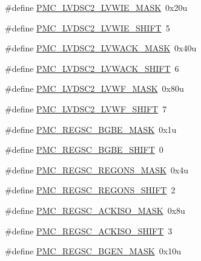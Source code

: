 \begin{DoxyCompactItemize}
\item 
\#define \hyperlink{group___p_m_c___register___masks_ga3a9de69524d99d6ec8985d211bc7861d}{P\+M\+C\+\_\+\+L\+V\+D\+S\+C2\+\_\+\+L\+V\+W\+I\+E\+\_\+\+M\+A\+SK}~0x20u
\item 
\#define \hyperlink{group___p_m_c___register___masks_gaf5cb9cf53bade8254aa7749b5eb36eff}{P\+M\+C\+\_\+\+L\+V\+D\+S\+C2\+\_\+\+L\+V\+W\+I\+E\+\_\+\+S\+H\+I\+FT}~5
\item 
\#define \hyperlink{group___p_m_c___register___masks_ga8b0c8bcad4d38e6ff797e9bc3d9db6d7}{P\+M\+C\+\_\+\+L\+V\+D\+S\+C2\+\_\+\+L\+V\+W\+A\+C\+K\+\_\+\+M\+A\+SK}~0x40u
\item 
\#define \hyperlink{group___p_m_c___register___masks_ga99ad1d373a7be7591a7ee3577bed5374}{P\+M\+C\+\_\+\+L\+V\+D\+S\+C2\+\_\+\+L\+V\+W\+A\+C\+K\+\_\+\+S\+H\+I\+FT}~6
\item 
\#define \hyperlink{group___p_m_c___register___masks_ga34187b0598a3e166a457818770a616d4}{P\+M\+C\+\_\+\+L\+V\+D\+S\+C2\+\_\+\+L\+V\+W\+F\+\_\+\+M\+A\+SK}~0x80u
\item 
\#define \hyperlink{group___p_m_c___register___masks_ga8bcfb9fc5fd4a92164b2aa6cdb6db77e}{P\+M\+C\+\_\+\+L\+V\+D\+S\+C2\+\_\+\+L\+V\+W\+F\+\_\+\+S\+H\+I\+FT}~7
\item 
\#define \hyperlink{group___p_m_c___register___masks_ga98cf5c98c133e20fb620faa6ca29d98e}{P\+M\+C\+\_\+\+R\+E\+G\+S\+C\+\_\+\+B\+G\+B\+E\+\_\+\+M\+A\+SK}~0x1u
\item 
\#define \hyperlink{group___p_m_c___register___masks_ga2e23aa8155158c86fc53ccd8baccf24d}{P\+M\+C\+\_\+\+R\+E\+G\+S\+C\+\_\+\+B\+G\+B\+E\+\_\+\+S\+H\+I\+FT}~0
\item 
\#define \hyperlink{group___p_m_c___register___masks_gab830f2c82eef6d0db7caab8ee5689ba6}{P\+M\+C\+\_\+\+R\+E\+G\+S\+C\+\_\+\+R\+E\+G\+O\+N\+S\+\_\+\+M\+A\+SK}~0x4u
\item 
\#define \hyperlink{group___p_m_c___register___masks_ga06b4e6d970f2610a635c92bb1270541d}{P\+M\+C\+\_\+\+R\+E\+G\+S\+C\+\_\+\+R\+E\+G\+O\+N\+S\+\_\+\+S\+H\+I\+FT}~2
\item 
\#define \hyperlink{group___p_m_c___register___masks_ga35ced6f0f133b2d5892bdcba3e0b2832}{P\+M\+C\+\_\+\+R\+E\+G\+S\+C\+\_\+\+A\+C\+K\+I\+S\+O\+\_\+\+M\+A\+SK}~0x8u
\item 
\#define \hyperlink{group___p_m_c___register___masks_gad2b9b6ce6aa455e8607fd3c2d1647544}{P\+M\+C\+\_\+\+R\+E\+G\+S\+C\+\_\+\+A\+C\+K\+I\+S\+O\+\_\+\+S\+H\+I\+FT}~3
\item 
\#define \hyperlink{group___p_m_c___register___masks_ga7e1520a56f4d2675018d5efaa9492f19}{P\+M\+C\+\_\+\+R\+E\+G\+S\+C\+\_\+\+B\+G\+E\+N\+\_\+\+M\+A\+SK}~0x10u

\end{DoxyCompactItemize}

